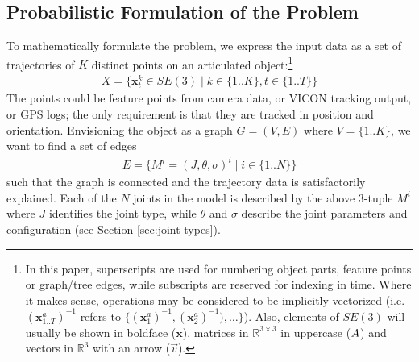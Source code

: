 \documentclass[a4paper,orivec]{llncs}
\def\xmat{\uppercase}    \def\xmatstr{in uppercase}
\def\xvec{\vec}          \def\xvecstr{with an arrow}
\def\xse{\bm}            \def\xsestr{in boldface}
\begin{document}
\subsection{Probabilistic Formulation of the Problem}
To mathematically formulate the problem, we express the input data as a set of trajectories of $K$ distinct points on an articulated object:\footnote{In this paper, superscripts are used for numbering object parts, feature points or graph/tree edges, while subscripts are reserved for indexing in time. Where it makes sense, operations may be considered to be implicitly vectorized (i.e. $(\xse{x}_{1..T}^a)^{-1}$ refers to $\{(\xse{x}_1^a)^{-1}, (\xse{x}_2^a)^{-1}), \dots\}$). Also, elements of $SE(3)$ will usually be shown \xsestr{} ($\xse{x}$), matrices in $\mathbb{R}^{3 \times 3}$ \xmatstr{} ($\xmat{a}$) and vectors in $\mathbb{R}^3$ \xvecstr{} ($\xvec{v}$).}
\begin{align}
  X = \{ \xse{x}_t^k \in SE(3) \mid k \in \{1..K\}, t \in \{1..T\} \}
\end{align}
The points could be feature points from camera data, or VICON tracking output, or GPS logs; the only requirement is that they are tracked in position and orientation. Envisioning the object as a graph $G = (V,E)$ where $V = \{1..K\}$, we want to find a set of edges
\begin{align}
  E = \{M^i = (J,\theta,\sigma)^i \mid i \in \{1..N\}\} \label{eqn:m-tuple}
\end{align}
such that the graph is connected and the trajectory data is satisfactorily explained. Each of the $N$ joints in the model is described by the above 3-tuple $M^i$ where $J$ identifies the joint type, while $\theta$ and $\sigma$ describe the joint parameters and configuration (see Section \ref{sec:joint-types}).
\end{document}
